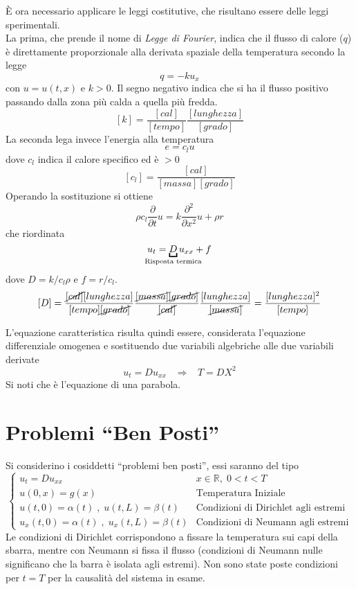 \`E ora necessario applicare le leggi costitutive, che risultano essere delle
leggi sperimentali.\\
La prima, che prende il nome di \textit{Legge di Fourier}, indica che il flusso
di calore ($q$) \`e direttamente proporzionale
alla derivata spaziale della temperatura secondo la legge
\[
	q= -ku_x
\]
con $u=u(t,x)$ e $k>0$. Il segno negativo indica che si ha il flusso positivo
passando dalla zona pi\`u calda a quella pi\`u fredda.
\[
	[k]= \frac{[cal]}{[tempo]}\frac{[lunghezza]}{[grado]}
\]
La seconda lega invece l'energia alla temperatura
\[
	e= c_lu
\]
dove $c_l$ indica il calore specifico ed \`e $>0$
\[
	[c_l]=\frac{[cal]}{[massa][grado]}
\]
Operando la sostituzione si ottiene
\[
	\rho c_l \frac{\partial}{\partial t} u= k \frac{\partial^2}{\partial
x^2}u + \rho r
\]
che riordinata
\[
	u_t= \underbracket{D}_{\mathclap{\text{Risposta termica}}} u_{xx}+f
\]
dove $D=k/c_l\rho$ e $f=r/c_l$.
\[
	[D]=\frac{\cancel{[cal]}[lunghezza]}{[tempo]\cancel{[grado]}}\frac{
\cancel{[massa]}\cancel{[grado]}}{\cancel{[cal]}}
	\frac{[lunghezza]}{\cancel{[massa]}}=\frac{[lunghezza]^2}{[tempo]}
\]

L'equazione caratteristica risulta quindi essere, considerata l'equazione
differenziale omogenea e sostituendo due variabili algebriche alle due variabili
derivate
\[
	u_t= Du_{xx} \;\;\; \Rightarrow \;\;\; T=DX^2
\]
Si noti che \`e l'equazione di una parabola.

\section{Problemi ``Ben Posti''}
Si considerino i cosiddetti ``problemi ben posti'', essi saranno del tipo
\[
	\left\{
	\begin{array}{ll}
		u_t=Du_{xx} & x\in\mathbb{R}, \; 0<t<T \\
		u(0,x)=g(x) & \text{Temperatura Iniziale}\\
		u(t,0)=\alpha(t) \; , \; u(t,L)=\beta(t) & \text{Condizioni di
Dirichlet agli estremi}\\
		u_x(t,0)=\alpha(t) \; , \; u_x(t,L)=\beta(t) & \text{Condizioni
di Neumann agli estremi}
	\end{array}
	\right.
\]
Le condizioni di Dirichlet corrispondono a fissare la temperatura sui capi della
sbarra, mentre con Neumann si fissa
il flusso (condizioni di Neumann nulle significano che la barra \`e isolata agli
estremi). Non sono state poste condizioni per $t=T$
per la causalit\`a del sistema in esame.

